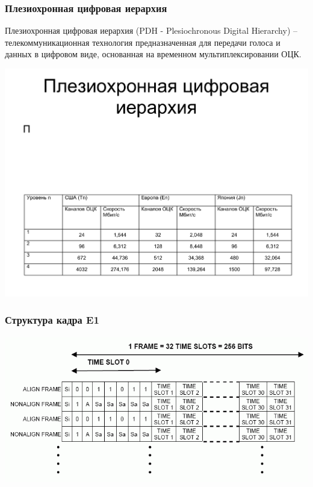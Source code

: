 \documentclass[utf8]{beamer}
\begin{document}
\begin{frame}
\frametitle{Плезиохронная цифровая иерархия}
Плезиохронная цифровая иерархия (PDH - Plesiochronous Digital Hierarchy) – телекоммуникационная технология предназначенная для передачи голоса и данных в цифровом виде, основанная на временном мультиплексировании ОЦК.
\begin{center}
\includegraphics[width=\textwidth]{pic/pdh.pdf}
\end{center}
\end{frame}
\begin{frame}
\frametitle{Структура кадра E1}
\begin{center}
\includegraphics[width=\textwidth]{pic/e1.png}
\end{center}
\end{frame}
\end{document}
